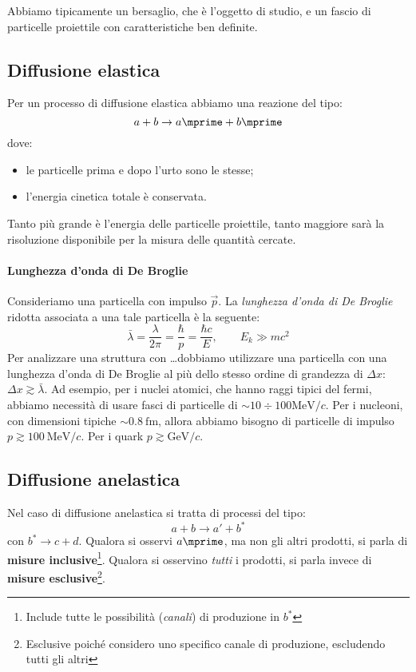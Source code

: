 Abbiamo tipicamente un bersaglio, che è l'oggetto di studio, e un fascio di
particelle proiettile con caratteristiche ben definite.

\subsection{Diffusione elastica}
Per un processo di diffusione elastica abbiamo una reazione del tipo:
\begin{equation}
	a + b \rightarrow a \mprime + b \mprime
\end{equation}
dove:
\begin{itemize}
	\item le particelle prima e dopo l'urto sono le stesse;
	\item l'energia cinetica totale è conservata.
\end{itemize}

\begin{note}
	Tanto più grande è l'energia delle particelle proiettile, tanto maggiore sarà
	la risoluzione disponibile per la misura delle quantità cercate.
\end{note}

\paragraph{Lunghezza d'onda di De Broglie}
Consideriamo una particella con impulso $\vec{p}$. La \textit{lunghezza d'onda
	di De Broglie} ridotta associata a una tale particella è la seguente:
\begin{equation}
	\bar{\lambda}
	= \frac{\lambda}{2 \pi}
	= \frac{\hbar}{p}
	= \frac{\hbar c}{E},
	\qquad
	E_k \gg m c^2
\end{equation}
Per analizzare una struttura con \dots dobbiamo utilizzare una particella con
una lunghezza d'onda di De Broglie al più dello stesso ordine di grandezza di
$\Delta x$: $\Delta x \gtrsim \bar{\lambda}$.
Ad esempio, per i nuclei atomici, che hanno raggi tipici del fermi, abbiamo
necessità di usare fasci di particelle di $\sim 10 \div 100 \unit{\MeV \per c}$.
Per i nucleoni, con dimensioni tipiche $\sim \qty{0.8}{\femto\metre}$, allora
abbiamo bisogno di particelle di impulso $p \gtrsim \qty{100}{\MeV \per c}$.
Per i quark $p \gtrsim \unit{\GeV \per c}$.

\subsection{Diffusione anelastica}
Nel caso di diffusione anelastica si tratta di processi del tipo:
\begin{equation}
	a + b \rightarrow a' + b^{\ast}
\end{equation}
con $b^{\ast} \rightarrow c + d$.
Qualora si osservi $a \mprime$, ma non gli altri prodotti, si parla di
\textbf{misure inclusive}\footnote{
	Include tutte le possibilità (\textit{canali}) di produzione in $b^{\ast}$
}. Qualora si osservino \textit{tutti} i prodotti, si
parla invece di \textbf{misure esclusive}\footnote{
	Esclusive poiché considero uno specifico canale di produzione, escludendo
	tutti gli altri
}.

